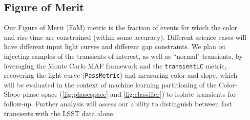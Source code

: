 \documentclass[letterpaper,longauthor,trackchanges,twocolumn,onecolappendix,sort&compress]{aastex62}
\begin{document}
\subsection{Figure of Merit}

Our Figure of Merit (FoM) metric is the fraction of events for which the color and rise-time are constrained (within some accuracy). Different science cases will have different input light curves and different gap constraints. We plan on injecting samples of the transients of interest, as well as ``normal" transients, by leveraging the Monte Carlo MAF framework and the {\tt transientLC} metric, recovering the light curve ({\tt PassMetric}) and measuring color and slope, which will be evaluated in the context of  machine learning partitioning of the Color-Slope phase space (\autoref{fig:phasespace} and \autoref{fig:classifier}) to isolate transients for follow-up. Further analysis will assess our ability to distinguish between fast transients with the LSST data alone.



%

%
\end{document}
